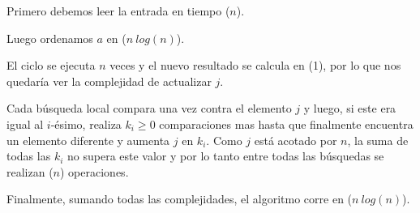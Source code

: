 Primero debemos leer la entrada en tiempo \bigo($n$).

Luego ordenamos $a$ en \bigo($n\ log(n)$).

El ciclo se ejecuta $n$ veces y el nuevo resultado se calcula en \bigo(1),
por lo que nos quedaría ver la complejidad de actualizar $j$.

Cada búsqueda local compara una vez contra el elemento $j$ y luego, si este era igual al $i$-ésimo,
realiza $k_i \geq 0$ comparaciones mas hasta que finalmente encuentra un elemento diferente y aumenta
$j$ en $k_i$. Como $j$ está acotado por $n$, la suma de todas las $k_i$ no supera este valor y por lo
tanto entre todas las búsquedas se realizan \bigo($n$) operaciones.

Finalmente, sumando todas las complejidades, el algoritmo corre en \bigo($n\ log(n)$).
